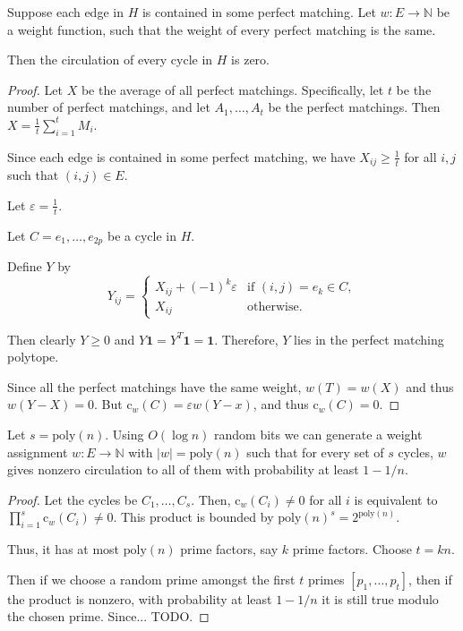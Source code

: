 \documentclass{beamer}
\newcommand{\nn}{\mathbb{N}}
\newcommand{\cl}{\text{c}}
\begin{document}
\begin{frame}
  \begin{lemma}
    Suppose each edge in $H$ is contained in some perfect matching. Let
    $w : E \to \nn$ be a weight function,
    such that the weight of every perfect matching is the same.

    Then the circulation of every cycle in $H$ is zero.
  \end{lemma}

  \begin{proof}
    Let $X$ be the average of all perfect matchings.
    Specifically, let $t$ be the number of perfect matchings, and let
    $A_1, \ldots, A_t$ be the perfect matchings.
    Then $X = \frac{1}{t} \sum_{i = 1}^t M_i$.

    Since each edge is contained in some perfect matching, we have
    $X_{ij} \ge \frac{1}{t}$ for all $i, j$ such that
    $(i, j) \in E$.

    Let $\varepsilon = \frac{1}{t}$.

    Let $C = {e_1, \ldots, e_{2p}}$ be a cycle in $H$.

    Define $Y$ by
    \[
      Y_{ij} =
      \begin{cases}
        X_{ij} + (-1)^{k} \varepsilon & \text{if } (i, j) = e_k \in C, \\
        X_{ij}                        & \text{otherwise}.
      \end{cases}
    \]

    Then clearly $Y \ge 0$ and $Y \mathbf{1} = Y^T \mathbf{1} = \mathbf{1}$.
    Therefore, $Y$ lies in the perfect matching polytope.

    Since all the perfect matchings have the same weight, $w(T) = w(X)$
    and thus $w(Y - X) = 0$.
    But $\cl_w(C) = \varepsilon w(Y - x)$, and thus $\cl_w(C) = 0$.
  \end{proof}

  \begin{lemma}
    Let $s = \text{poly}(n)$. Using $O(\log n)$ random bits we can
    generate a weight assignment
    $w : E \to \nn$ with $|w| = \text{poly}(n)$ such that for every set
    of $s$ cycles,
    $w$ gives nonzero circulation to all of them with probability at
    least $1 - 1/n$.
  \end{lemma}

  \begin{proof}
    Let the cycles be $C_1, \ldots, C_s$. Then, $\cl_w(C_i) \ne 0$ for
    all $i$ is equivalent to
    $\prod_{i = 1}^s \cl_w(C_i) \ne 0$. This product is bounded by
    $\text{poly}(n)^s = 2^{\text{poly}(n)}$.

    Thus, it has at most $\text{poly}(n)$ prime factors, say $k$ prime
    factors. Choose $t = kn$.

    Then if we choose a random prime amongst the first $t$ primes
    $[p_1, \ldots, p_t]$, then if the product is nonzero,
    with probability at least $1 - 1/n$ it is still true modulo the chosen prime.
    Since... TODO.
  \end{proof}
\end{frame}
\end{document}
